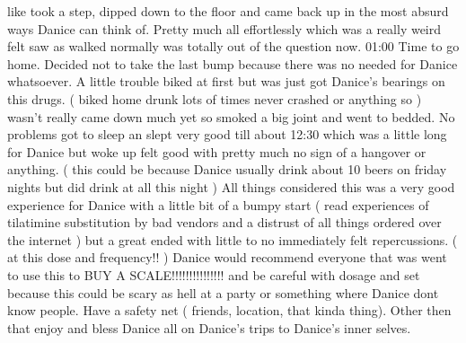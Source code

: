 \documentclass[12pt]{book}
\begin{document}
like took a step, dipped down to the floor and came back up in the most absurd ways Danice can think of. Pretty much all effortlessly which was a really weird felt saw as walked normally was totally out of the question now. 01:00 Time to go home. Decided not to take the last bump because there was no needed for Danice whatsoever. A little trouble biked at first but was just got Danice's bearings on this drugs. ( biked home drunk lots of times never crashed or anything so ) wasn't really came down much yet so smoked a big joint and went to bedded. No problems got to sleep an slept very good till about 12:30 which was a little long for Danice but woke up felt good with pretty much no sign of a hangover or anything. ( this could be because Danice usually drink about 10 beers on friday nights but did drink at all this night ) All things considered this was a very good experience for Danice with a little bit of a bumpy start ( read experiences of tilatimine substitution by bad vendors and a distrust of all things ordered over the internet ) but a great ended with little to no immediately felt repercussions. ( at this dose and frequency!! ) Danice would recommend everyone that was went to use this to BUY A SCALE!!!!!!!!!!!!!!! and be careful with dosage and set because this could be scary as hell at a party or something where Danice dont know people. Have a safety net ( friends, location, that kinda thing). Other then that enjoy and bless Danice all on Danice's trips to Danice's inner selves.
\end{document}
